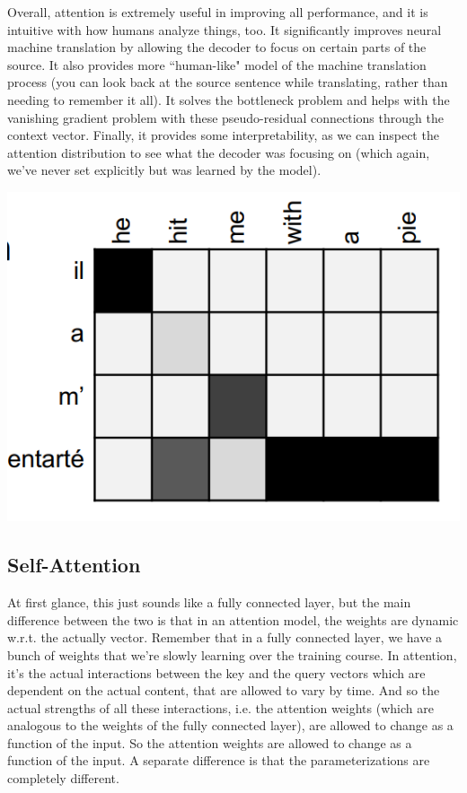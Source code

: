 \documentclass{article}
\theoremstyle{definition}
\theoremstyle{remark}
\theoremstyle{definition}
\begin{document}
Overall, attention is extremely useful in improving all performance, and it is intuitive with how humans analyze things, too. It significantly improves neural machine translation by allowing the decoder to focus on certain parts of the source. It also provides more ``human-like" model of the machine translation process (you can look back at the source sentence while translating, rather than needing to remember it all). It solves the bottleneck problem and helps with the vanishing gradient problem with these pseudo-residual connections through the context vector. Finally, it provides some interpretability, as we can inspect the attention distribution to see what the decoder was focusing on (which again, we've never set explicitly but was learned by the model). 
\begin{center}
  \includegraphics[scale=0.3]{img/attention_distribution.png}
\end{center}


\subsection{Self-Attention}

At first glance, this just sounds like a fully connected layer, but the main difference between the two is that in an attention model, the weights are dynamic w.r.t. the actually vector. Remember that in a fully connected layer, we have a bunch of weights that we're slowly learning over the training course. In attention, it's the actual interactions between the key and the query vectors which are dependent on the actual content, that are allowed to vary by time. And so the actual strengths of all these interactions, i.e. the attention weights (which are analogous to the weights of the fully connected layer), are allowed to change as a function of the input. So the attention weights are allowed to change as a function of the input. A separate difference is that the parameterizations are completely different. 
\end{document}
